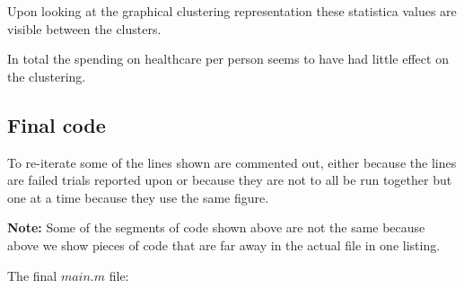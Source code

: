\documentclass[12pt, a4paper]{article}
\begin{document}
Upon looking at the graphical clustering representation these statistica values are visible between the clusters.
\newline

In total the spending on healthcare per person seems to have had little effect on the clustering.
\newline

\subsection{Final code}

To re-iterate some of the lines shown are commented out, either because the lines are failed trials reported upon or because they are not to all be run together but one at a time because they use the same figure.
\newline

\textbf{Note: }Some of the segments of code shown above are not the same because above we show pieces of code that are far away in the actual file in one listing.
\newline

The final $main.m$ file:
\end{document}

